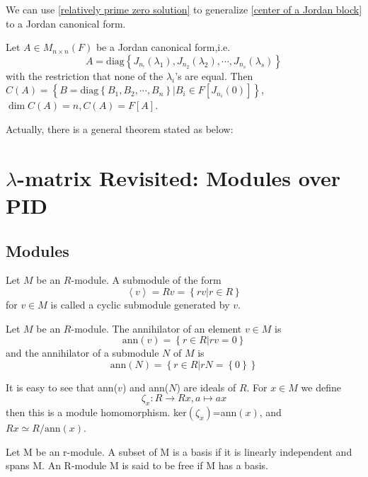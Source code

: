 We can use \ref{relatively prime zero solution} to generalize \ref{center of a Jordan block} to a Jordan canonical form.
\begin{theorem}
Let $A\in M_{n\times n}(F)$ be a Jordan canonical form,i.e.\[A=\text{diag}\left \{J_{n_!}(\lambda_1),J_{n_2}(\lambda_2),\cdots,J_{n_s}(\lambda_s)\right\}\]
with the restriction that none of the $\lambda_i$'s are equal. Then $C(A)=\left\{B=\text{diag}\left\{B_1,B_2,\cdots,B_n\right\}|B_i\in F[J_{n_i}(0)]\right\}$, $\dim C(A)=n, C(A)=F[A]$.
\end{theorem}
Actually, there is a general theorem stated as below:

\section{$\lambda$-matrix Revisited: Modules over PID}
\subsection{Modules}
\begin{definition}
Let $M$ be an $R$-module. A submodule of the form\[\left \langle v \right \rangle =Rv=\left \{ rv|r\in R \right \} \]for $v\in M$ is called a cyclic submodule generated by $v$.
\end{definition}
\begin{definition}
Let $M$ be an $R$-module. The annihilator of an element $v\in M$ is \[\text{ann}(v)=\left\{r\in R|rv=0\right\}\]and the annihilator of a submodule $N$ of $M$ is \[\text{ann}(N)=\left\{r\in R|rN=\left\{0\right\}\right\}\]
\end{definition}
It is easy to see that ann($v$) and ann($N$) are ideals of $R$. For $x\in M$ we define \[\zeta_x: R\longrightarrow Rx, a\mapsto ax\]then this is a module homomorphism. ker$(\zeta_x)$=ann$(x)$, and $Rx\simeq R/\text{ann}(x)$.
\begin{definition}
Let M be an r-module. A subset of M is a basis if it is linearly independent and spans M. An R-module M is said to be free if M has a basis.
\end{definition}
\begin{theorem}

\end{theorem}
